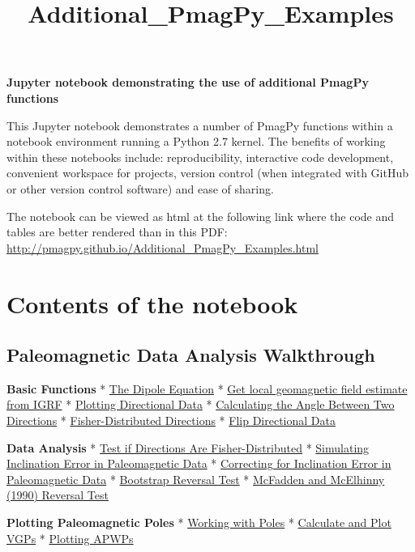 \documentclass{article}
\title{Additional\_PmagPy\_Examples}
\begin{document}
    
    {\textbf{\LARGE{Jupyter notebook demonstrating the use of additional PmagPy
functions}}\label{jupyter-notebook-demonstrating-the-use-of-additional-pmagpy-functions}

    This Jupyter notebook demonstrates a number of PmagPy functions within a
notebook environment running a Python 2.7 kernel. The benefits of
working within these notebooks include: reproducibility, interactive
code development, convenient workspace for projects, version control
(when integrated with GitHub or other version control software) and ease
of sharing.

The notebook can be viewed as html at the following link where the code and tables are better rendered than in this PDF: \url{http://pmagpy.github.io/Additional_PmagPy_Examples.html}

\section{Contents of the notebook}
\subsection{Paleomagnetic Data Analysis
Walkthrough}\label{paleomagnetic-data-analysis-walkthrough}

\textbf{Basic Functions} * \hyperref[The-dipole-equation]{The Dipole
Equation} *
\hyperref[Get-local-geomagnetic-field-estimate-from-IGRF]{Get local
geomagnetic field estimate from IGRF} *
\hyperref[Plotting-Directions]{Plotting Directional Data} *
\hyperref[Calculate-the-Angle-Between-Directions]{Calculating the Angle
Between Two Directions} *
\hyperref[Generate-and-plot-Fisher-distributed-unit-vectors-from-a-specified-distribution]{Fisher-Distributed
Directions} * \hyperref[Flip-polarity-of-directional-data]{Flip
Directional Data}

\textbf{Data Analysis} *
\hyperref[Test-directional-data-for-Fisher-distribution]{Test if
Directions Are Fisher-Distributed} *
\hyperref[Squish-directional-data]{Simulating Inclination Error in
Paleomagnetic Data} * \hyperref[Unsquish-directional-data]{Correcting
for Inclination Error in Paleomagnetic Data} *
\hyperref[Bootstrap-Reversal-Test]{Bootstrap Reversal Test} *
\hyperref[MM1990]{McFadden and McElhinny (1990) Reversal Test}

\textbf{Plotting Paleomagnetic Poles} *
\hyperref[Working-with-Poles]{Working with Poles} *
\hyperref[Calculate-and-Plot-VGPs]{Calculate and Plot VGPs} *
\hyperref[Plotting-APWPs]{Plotting APWPs}

}
\end{document}
